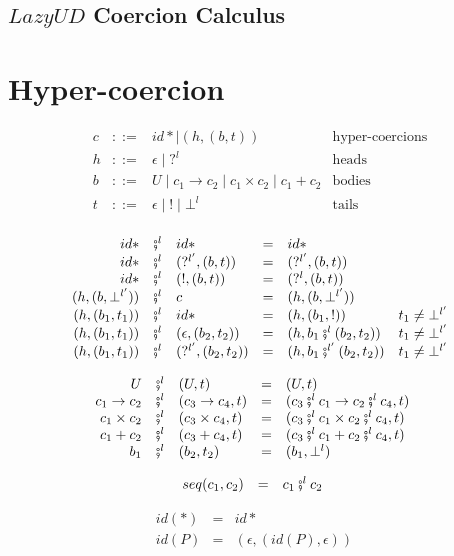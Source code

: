 \documentclass[acmsmall,review,anonymous]{acmart}\settopmatter{printfolios=true,printccs=false,printacmref=false}
\newcommand{\stxrule}[3]{#1 & ::= & #3 & \text{#2}\\}
\newcommand{\funrule}[3]{#1 & = & #2 & #3\\}
\newcommand{\comprule}[4]{#1 & \fatsemi^l & #2 & = & #3 & #4 \\}
\newcommand{\plus}[0]{+}
\begin{document}
\subsection{$Lazy UD$ Coercion Calculus}

\section{Hyper-coercion} \label{sec:hyper-coercion}

\begin{figure}
	\[ 
	\begin{array}{lclr}
	\stxrule{c}{hyper-coercions}{
		id* \mid{}
		( h , ( b , t ) )
	}
	\stxrule{h}{heads}{
		\epsilon \mid{}
		?^l
	}
	\stxrule{b}{bodies}{
		U \mid{}
		c_1 \rightarrow c_2 \mid{}
		c_1 \times c_2 \mid{}
		c_1 \plus c_2
	}
	\stxrule{t}{tails}{
		\epsilon \mid{}
		! \mid{}
		\bot^l
	}
	\end{array}
	\]
	
	\[ 
	\begin{array}{rclclr}
	\comprule{id*}{id*}{
		id*
	}{}
	\comprule{id*}{( ?^{l'} , ( b , t ) )}{
		( ?^{l'} , ( b , t ) )
	}{}
	\comprule{id*}{( ! , ( b , t ) )}{
		(?^{l} , ( b , t))
	}{}
	\comprule{(h , (b ,\bot^{l'}))}{c}{
		(h , (b ,\bot^{l'}))
	}{}
	\comprule{(h , (b_1 , t_1))}{id*}{
		(h , (b_1 , !))
	}{t_1 \neq \bot^{l'}}
	\comprule{(h , (b_1 , t_1))}{(\epsilon , (b_2 , t_2))}{
		(h , b_1 \fatsemi^{l} (b_2 , t_2))
	}{t_1 \neq \bot^{l'}}
	\comprule{(h , (b_1 , t_1))}{(?^{l'} , (b_2 , t_2))}{
		(h , b_1 \fatsemi^{l'} (b_2 , t_2))
	}{t_1 \neq \bot^{l'}}
	\end{array}
	\]
	
	\[ 
	\begin{array}{rclclr}
	\comprule{U}{(U,t)}{
		(U,t)
	}{}
	\comprule{c_1 \rightarrow c_2}{(c_3 \rightarrow c_4,t)}{
		(c_3 \fatsemi^{l} c_1 \rightarrow c_2 \fatsemi^l c_4, t)
	}{}
	\comprule{c_1 \times c_2}{(c_3 \times c_4,t)}{
		(c_3 \fatsemi^{l} c_1 \times c_2 \fatsemi^l c_4, t)
	}{}
	\comprule{c_1 \plus c_2}{(c_3 \plus c_4,t)}{
		(c_3 \fatsemi^{l} c_1 \plus c_2 \fatsemi^l c_4, t)
	}{}
	\comprule{b_1}{(b_2,t_2)}{
		(b_1,\bot^l)
	}{}
	\end{array}
	\]
	
	\[
	\begin{array}{rclr}
	\funrule{seq(c_1,c_2)}{
		c_1 \fatsemi^l c_2
	}{}
	\end{array}
	\]
	
	\[
	\begin{array}{rclr}
	\funrule{id(*)}{
		id*
	}{}
	\funrule{id(P)}{
		(\epsilon,(id(P),\epsilon))
	}{}
	\end{array}
	\]
	

\end{figure}
\end{document}

